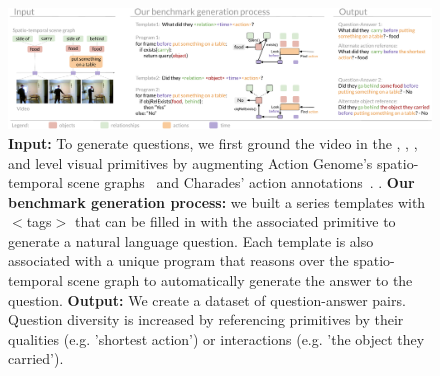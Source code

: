 \begin{figure}[t]
    \centering
    \includegraphics[width=0.95\linewidth]{figures/system.pdf}
    \caption{\textbf{Input:} To generate questions, we first ground the video in the , , , and  level visual primitives by augmenting Action Genome's spatio-temporal scene graphs~\cite{ji2020action} and Charades' action annotations~\cite{sigurdsson2016hollywood}.  . \textbf{Our benchmark generation process:} we built a series templates with $<$tags$>$ that can be filled in with the associated primitive to generate a natural language question. Each template is also associated with a unique program that reasons over the spatio-temporal scene graph to automatically generate the answer to the question. \textbf{Output: } We create a dataset of question-answer pairs. Question diversity is increased by referencing primitives by their qualities (e.g. 'shortest action') or interactions (e.g. 'the object they carried').}
    \label{fig:system}
\end{figure}